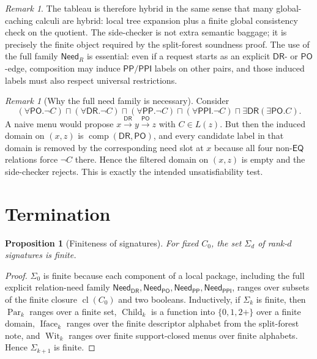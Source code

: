 \documentclass[11pt]{article}
\newtheorem{proposition}[definition]{Proposition}
\theoremstyle{remark}
\newtheorem{remark}[definition]{Remark}
\newcommand{\DR}{\mathsf{DR}}
\newcommand{\PO}{\mathsf{PO}}
\newcommand{\PP}{\mathsf{PP}}
\newcommand{\PPI}{\mathsf{PPI}}
\newcommand{\EQ}{\mathsf{EQ}}
\newcommand{\cl}{\operatorname{cl}}
\newcommand{\Par}{\operatorname{Par}}
\newcommand{\Child}{\operatorname{Child}}
\newcommand{\Iface}{\operatorname{Iface}}
\newcommand{\Wit}{\operatorname{Wit}}
\newcommand{\NeedDR}{\mathsf{Need}_{\DR}}
\newcommand{\NeedPO}{\mathsf{Need}_{\PO}}
\newcommand{\NeedPP}{\mathsf{Need}_{\PP}}
\newcommand{\NeedPPI}{\mathsf{Need}_{\PPI}}
\newcommand{\comp}{\operatorname{comp}}
\begin{document}
\begin{remark}
The tableau is therefore hybrid in the same sense that many global-caching calculi are hybrid: local tree expansion plus a finite global consistency check on the quotient. The side-checker is not extra semantic baggage; it is precisely the finite object required by the split-forest soundness proof. The use of the full family $\mathsf{Need}_R$ is essential: even if a request starts as an explicit $\DR$- or $\PO$-edge, composition may induce $\PP/\PPI$ labels on other pairs, and those induced labels must also respect universal restrictions.
\end{remark}

\begin{remark}[Why the full need family is necessary]
Consider
\[
(\forall \PO.\neg C)\sqcap(\forall \DR.\neg C)\sqcap(\forall \PP.\neg C)\sqcap(\forall \PPI.\neg C)\sqcap \exists \DR(\exists \PO.C).
\]
A naive menu would propose $x\xrightarrow{\DR} y\xrightarrow{\PO} z$ with $C\in L(z)$. But then the induced domain on $(x,z)$ is $\comp(\DR,\PO)$, and every candidate label in that domain is removed by the corresponding need slot at $x$ because all four non-$\EQ$ relations force $\neg C$ there. Hence the filtered domain on $(x,z)$ is empty and the side-checker rejects. This is exactly the intended unsatisfiability test.
\end{remark}

\section{Termination}

\begin{proposition}[Finiteness of signatures]\label{prop:finitely-many-signatures}
For fixed $C_0$, the set $\Sigma_d$ of rank-$d$ signatures is finite.
\end{proposition}

\begin{proof}
$\Sigma_0$ is finite because each component of a local package, including the full explicit relation-need family $\NeedDR,\NeedPO,\NeedPP,\NeedPPI$, ranges over subsets of the finite closure $\cl(C_0)$ and two booleans. Inductively, if $\Sigma_k$ is finite, then $\Par_k$ ranges over a finite set, $\Child_k$ is a function into $\{0,1,2+\}$ over a finite domain, $\Iface_k$ ranges over the finite descriptor alphabet from the split-forest note, and $\Wit_k$ ranges over finite support-closed menus over finite alphabets. Hence $\Sigma_{k+1}$ is finite.
\end{proof}
\end{document}
